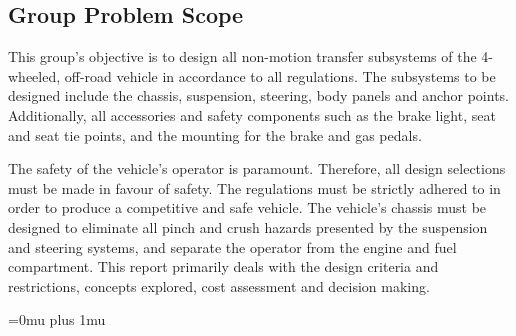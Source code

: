 \documentclass[12pt,twoside]{article}
\begin{document}
    \subsection{Group Problem Scope}
    This group's objective is to design all non-motion transfer subsystems of the 4-wheeled, off-road vehicle in accordance to all regulations. The subsystems to be designed include the chassis, suspension, steering, body panels and anchor points. Additionally, all accessories and safety components such as the brake light, seat and seat tie points, and the mounting for the brake and gas pedals.
    
    The safety of the vehicle's operator is paramount. Therefore, all design selections must be made in favour of safety. The regulations must be strictly adhered to in order to produce a competitive and safe vehicle. The vehicle's chassis must be designed to eliminate all pinch and crush hazards presented by the suspension and steering systems, and separate the operator from the engine and fuel compartment. This report primarily deals with the design criteria and restrictions, concepts explored, cost assessment and decision making.
    
    \newpage\null\thispagestyle{empty}\newpage


    \newpage

    \Urlmuskip=0mu plus 1mu\relax
    
    
    \newpage
       	


    \appendix


    \thispagestyle{plain}
\end{document}

